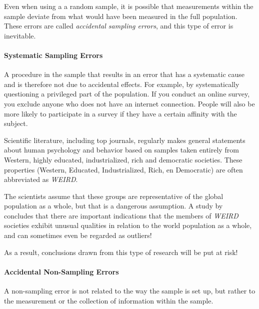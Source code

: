 Even when using a a random sample, it is possible that measurements within the sample deviate from what would have been measured in the full population. These errors are called \emph{accidental sampling errors}, and this type of error is inevitable.


\paragraph{Systematic Sampling Errors}

A procedure in the sample that results in an error that has a systematic cause and is therefore not due to accidental effects.
For example, by systematically questioning a privileged part of the population.
If you conduct an online survey, you exclude anyone who does not have an internet connection.
People will also be more likely to participate in a survey if they have a certain affinity with the subject.

\begin{example}
    Scientific literature, including top journals, regularly makes general statements about human psychology and behavior based on samples taken entirely from Western, highly educated, industrialized, rich and democratic societies. These properties (Western, Educated, Industrialized, Rich, en Democratic) are often abbreviated as \emph{WEIRD}.
    
    The scientists assume that these groups are representative of the global population as a whole, but that is a dangerous assumption.
    A study by~\textcite{HenrichEtAl2010} concludes that there are important indications that the members of \emph{WEIRD} societies exhibit unusual qualities in relation to the world population as a whole, and can sometimes even be regarded as outliers!
    
    As a result, conclusions drawn from this type of research will be put at risk!
\end{example}

\paragraph{Accidental Non-Sampling Errors}

A non-sampling error is not related to the way the sample is set up, but rather to the measurement or the collection of information within the sample.

